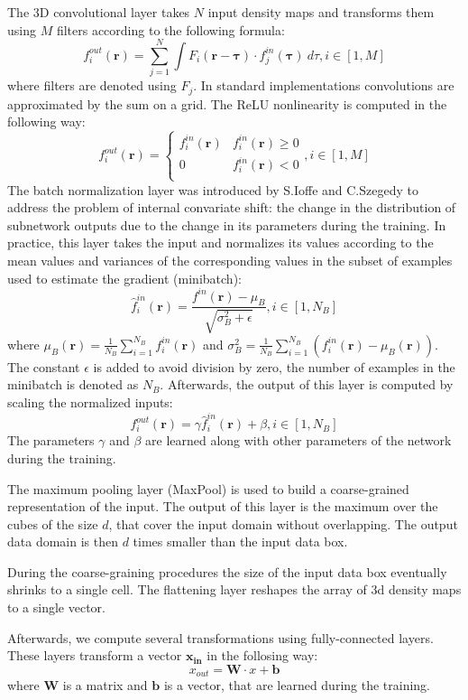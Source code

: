 The 3D convolutional layer takes $N$ input density maps and transforms them using $M$ filters
according to the following formula:
$$
f^{out}_i (\mathbf{r}) = \sum^{N}_{j=1} \int F_i (\mathbf{r} - \mathbf{\tau}) \cdot f^{in}_j(\mathbf{\tau}) ~d\tau, i \in [1,M]
$$
where filters are denoted using $F_j$. In standard implementations convolutions are approximated by the sum on a grid.
The ReLU nonlinearity is computed in the following way:
$$
f^{out}_i (\mathbf{r}) = \begin{cases}
               f^{in}_i(\mathbf{r})& f^{in}_i(\mathbf{r})\geq 0\\
               0                 &f^{in}_i(\mathbf{r})<0\\
            \end{cases}, i \in [1,M]
$$
The batch normalization layer was introduced by S.Ioffe and C.Szegedy \cite{ioffe2015batch} to address the problem of internal convariate shift:
the change in the distribution of subnetwork outputs due to the change in its parameters during the training. In practice, this layer takes the 
input and normalizes its values according to the mean values and variances of the corresponding values in the subset of examples used to estimate 
the gradient (minibatch):
$$
    \hat{f}^{in}_i(\mathbf{r}) = \frac{f^{in}(\mathbf{r}) - \mu_{B}}{\sqrt{\sigma^{2}_{B} + \epsilon}}, i \in [1,N_B]
$$
where $\mu_B(\mathbf{r}) = \frac{1}{N_B} \sum_{i=1}^{N_B} f^{in}_i(\mathbf{r})$ and 
$\sigma^{2}_{B} = \frac{1}{N_B} \sum_{i=1}^{N_B} \left( f^{in}_i(\mathbf{r}) - \mu_B (\mathbf{r}) \right)$. 
The constant $\epsilon$ is added to avoid division by zero, the number of 
examples in the minibatch is denoted as $N_B$. Afterwards, the output of this layer is computed by scaling the normalized inputs:
$$
f^{out}_i(\mathbf{r}) = \gamma \hat{f}^{in}_i(\mathbf{r}) + \beta, i \in [1,N_B]
$$
The parameters $\gamma$ and $\beta$ are learned along with other parameters of the network during the training.

The maximum pooling layer (MaxPool) is used to build a coarse-grained representation of the input. The output of this layer is 
the maximum over the cubes of the size $d$, that cover the input domain without overlapping. 
The output data domain is then $d$ times smaller than the input data box.

During the coarse-graining procedures the size of the input data box eventually shrinks to a single cell. The flattening layer reshapes the array of 
3d density maps to a single vector.

Afterwards, we compute several transformations using fully-connected layers. These layers transform a vector $\mathbf{x_{in}}$ in the follosing way:
$$
x_{out} = \mathbf{W} \cdot x + \mathbf{b}
$$
where $\mathbf{W}$ is a matrix and $\mathbf{b}$ is a vector, that are learned during the training.

